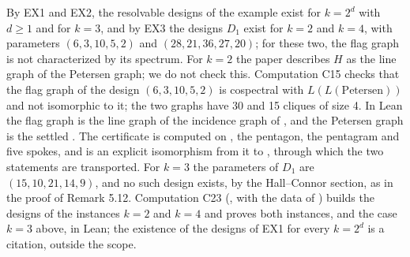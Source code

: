 \begin{remark}
 By EX1 and EX2, the resolvable designs of the example exist for $k=2^d$ with $d\ge1$ and for
 $k=3$, and by EX3 the designs $D_1$ exist for $k=2$ and $k=4$, with parameters $(6,3,10,5,2)$
 and $(28,21,36,27,20)$; for these two, the flag graph is not characterized by its spectrum. For
 $k=2$ the paper describes $H$ as the line graph of the Petersen graph; we do not check this.
 Computation C15 checks that the flag graph of the design $(6,3,10,5,2)$ is cospectral with
 $L(L(\text{Petersen}))$ and not isomorphic to it; the two graphs have 30 and 15 cliques of
 size 4. In Lean the flag graph is the line graph of the incidence graph of
 , and the Petersen graph is the settled
 . The certificate is computed on ,
 the pentagon, the pentagram and five spokes, and  is an
 explicit isomorphism from it to , through which the two statements
 are transported. For $k=3$ the parameters of $D_1$ are $(15,10,21,14,9)$, and no such design exists, by the Hall--Connor section, as in the proof of
 Remark 5.12. Computation C23 (, with the data of
 ) builds the designs of the instances $k=2$ and $k=4$ and proves
 both instances, and the case $k=3$ above, in Lean; the existence of the designs of EX1 for every
 $k=2^d$ is a citation, outside the scope.
\end{remark}

\endgroup
